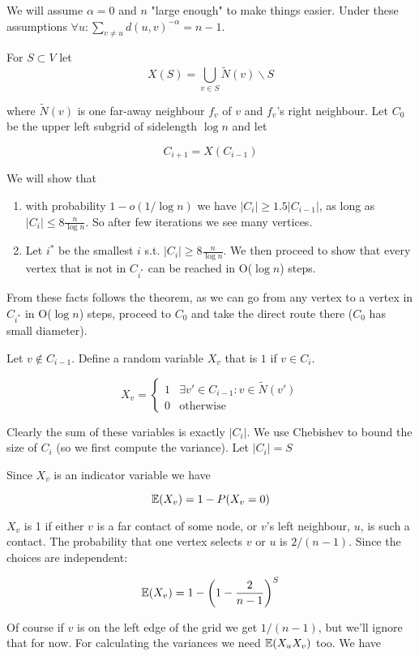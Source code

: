 \begin{pr} We will assume $\alpha=0$ and $n$ "large enough" to make things easier. Under these assumptions $\forall u: \sum_{v\neq u} d(u,v)^{-\alpha} = n-1$. 

For $S\subset V$ let 
\[X(S) = \bigcup_{v\in S} \tilde N(v) \backslash S\]

where $\tilde N(v)$ is one far-away neighbour $f_v$ of $v$ and $f_v$'s right neighbour. Let $C_0$ be the upper left subgrid of sidelength $\log n$ and let

\[C_{i+1} = X(C_{i-1})\]

We will show that 

\begin{enumerate}
\item with probability $1-o(1/\log n)$ we have $|C_i| \geq 1.5 |C_{i-1}|$, as long as $|C_i| \leq 8 \frac{n}{\log n}$. So after few iterations we see many vertices. 
\item Let $i^*$ be the smallest $i$ s.t. $|C_i| \geq 8\frac{n}{\log n}$. We then proceed to show that every vertex that is not in $C_{i^*}$ can be reached in O($\log n$) steps.
\end{enumerate}

From these facts follows the theorem, as we can go from any vertex to a vertex in $C_{i^*}$ in O($\log n$) steps, proceed to $C_0$ and take the direct route there ($C_0$ has small diameter).

Let $v\not \in C_{i-1}$. Define a random variable $X_v$ that is $1$ if $v\in C_i$.

\[X_v = \begin{cases} 1& \exists v'\in C_{i-1}: v\in \tilde N(v')\\ 0& \text{otherwise}\end{cases}\]

Clearly the sum of these variables is exactly $|C_i|$. We use Chebishev to bound the size of $C_i$ (so we first compute the variance). Let $|C_i| = S$

Since $X_v$ is an indicator variable we have 

\[\mathbb{E}(X_v) = 1-P(X_v=0)\]
	
$X_v$ is 1 if either $v$ is a far contact of some node, or $v$'s left neighbour, $u$, is such a contact. The probability that one vertex selects $v$ or $u$ is $2/(n-1)$. Since the choices are independent:

\[\mathbb{E}(X_v) = 1-\left(1-\frac{2}{n-1}\right)^S\]

Of course if $v$ is on the left edge of the grid we get $1/(n-1)$, but we'll ignore that for now. For calculating the variances we need $\mathbb{E}(X_uX_v)$ too. We have


\end{pr}
